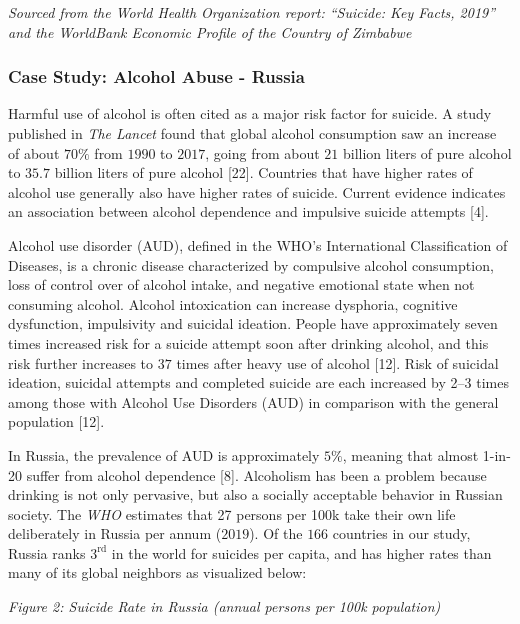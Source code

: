 \documentclass[]{article}
\begin{document}
\emph{Sourced from the World Health Organization report: ``Suicide: Key
Facts, 2019'' and the WorldBank Economic Profile of the Country of
Zimbabwe}

\newpage 

\subsubsection{Case Study: Alcohol Abuse -
Russia}\label{case-study-alcohol-abuse---russia}

Harmful use of alcohol is often cited as a major risk factor for
suicide. A study published in \emph{The Lancet} found that global
alcohol consumption saw an increase of about \(70\%\) from \(1990\) to
\(2017\), going from about \(21\) billion liters of pure alcohol to
\(35.7\) billion liters of pure alcohol {[}22{]}. Countries that have
higher rates of alcohol use generally also have higher rates of suicide.
Current evidence indicates an association between alcohol dependence and
impulsive suicide attempts {[}4{]}.

Alcohol use disorder (AUD), defined in the WHO's International
Classification of Diseases, is a chronic disease characterized by
compulsive alcohol consumption, loss of control over of alcohol intake,
and negative emotional state when not consuming alcohol. Alcohol
intoxication can increase dysphoria, cognitive dysfunction, impulsivity
and suicidal ideation. People have approximately seven times increased
risk for a suicide attempt soon after drinking alcohol, and this risk
further increases to \(37\) times after heavy use of alcohol {[}12{]}.
Risk of suicidal ideation, suicidal attempts and completed suicide are
each increased by 2--3 times among those with Alcohol Use Disorders
(AUD) in comparison with the general population {[}12{]}.

In Russia, the prevalence of AUD is approximately \(5\%\), meaning that
almost 1-in-20 suffer from alcohol dependence {[}8{]}. Alcoholism has
been a problem because drinking is not only pervasive, but also a
socially acceptable behavior in Russian society. The \emph{WHO}
estimates that 27 persons per 100k take their own life deliberately in
Russia per annum (\(2019\)). Of the \(166\) countries in our study,
Russia ranks \(3^{\text{rd}}\) in the world for suicides per capita, and
has higher rates than many of its global neighbors as visualized below:

\emph{Figure 2: Suicide Rate in Russia (annual persons per 100k
population)}
\end{document}
